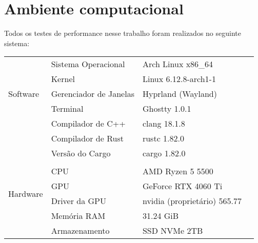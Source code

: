 \chapter{Ambiente computacional}

Todos os testes de performance nesse trabalho foram realizados no seguinte sistema:

\begin{table}[!ht]
	\centering
	\begin{tabular}{llll}
		\toprule
		\multirow{5}{3cm}{Software}
		 & Sistema Operacional          & Arch Linux x86\_64           & \\
		 & Kernel                       & Linux 6.12.8-arch1-1         & \\
		 & Gerenciador de Janelas       & Hyprland (Wayland)           & \\
		 & Terminal                     & Ghostty 1.0.1                & \\
		 & Compilador de C++            & clang 18.1.8                 & \\
		 & Compilador de Rust           & rustc 1.82.0                 & \\
		 & Versão do Cargo              & cargo 1.82.0                 & \\
		 &                              &                              & \\
		\multirow{4}{3cm}{Hardware}
		 & CPU                          & AMD Ryzen 5 5500             & \\
		 & GPU                          & GeForce RTX 4060 Ti          & \\
		 & Driver da GPU                & nvidia (proprietário) 565.77 & \\
		 & Memória RAM                  & 31.24 GiB                    & \\
		 & Armazenamento                & SSD NVMe 2TB                 & \\
		\bottomrule
	\end{tabular}
\end{table}

\noindent

